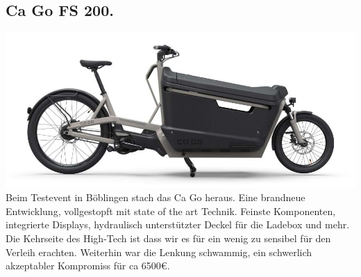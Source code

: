 \documentclass[a4paper,ngerman, 14pt] {scrartcl}
\begin{document}
\subsection{Ca Go FS 200.}

\includegraphics[scale=0.54]{ca_go.png}\\
Beim Testevent in Böblingen stach das Ca Go heraus. Eine brandneue Entwicklung, vollgestopft mit state of the art Technik. Feinste Komponenten, integrierte Displays, hydraulisch unterstützter Deckel für die Ladebox und mehr.\\
Die Kehrseite des High-Tech ist dass wir es für ein wenig zu sensibel für den Verleih erachten. Weiterhin war die Lenkung schwammig, ein schwerlich akzeptabler Kompromiss für ca 6500€.
\end{document}
